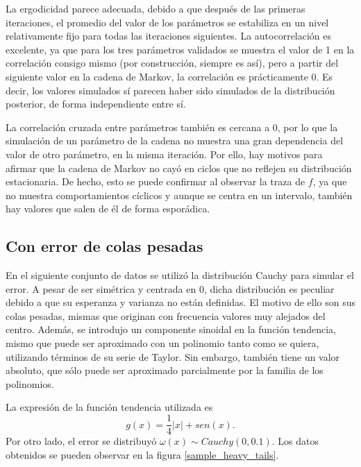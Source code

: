 La ergodicidad parece adecuada, debido a que después de las primeras iteraciones, el promedio del valor de los par\'ametros se estabiliza en un nivel relativamente fijo para todas las iteraciones siguientes. La autocorrelaci\'on es excelente, ya que para los tres par\'ametros validados se muestra el valor de 1 en la correlaci\'on consigo mismo (por construcci\'on, siempre es as\'i), pero a partir del siguiente valor en la cadena de Markov, la correlaci\'on es pr\'acticamente 0. Es decir, los valores simulados s\'i parecen haber sido simulados de la distribuci\'on posterior, de forma independiente entre s\'i.

La correlaci\'on cruzada entre par\'ametros tambi\'en es cercana a 0, por lo que la simulaci\'on de un par\'ametro de la cadena no muestra una gran dependencia del valor de otro par\'ametro, en la misma iteraci\'on. Por ello, hay motivos para afirmar que la cadena de Markov no cay\'o en ciclos que no reflejen su distribuci\'on estacionaria. De hecho, esto se puede confirmar al observar la traza de $f$, ya que no muestra comportamientos c\'iclicos y aunque se centra en un intervalo, tambi\'en hay valores que salen de \'el de forma espor\'adica.

\subsection{Con error de colas pesadas}

En el siguiente conjunto de datos se utiliz\'o la distribuci\'on Cauchy para simular el error. A pesar de ser sim\'etrica y centrada en 0, dicha distribuci\'on es peculiar debido a que su esperanza y varianza no est\'an definidas. El motivo de ello son sus colas pesadas, mismas que originan con frecuencia valores muy alejados del centro. Adem\'as, se introdujo un componente sinoidal en la funci\'on tendencia, mismo que puede ser aproximado con un polinomio tanto como se quiera, utilizando t\'erminos de su serie de Taylor. Sin embargo, tambi\'en tiene un valor absoluto, que s\'olo puede ser aproximado parcialmente por la familia de los polinomios.

La expresi\'on de la funci\'on tendencia utilizada es \begin{equation*}
    g(x) = \frac{1}{4}|x| + sen(x).
\end{equation*}
Por otro lado, el error se distribuy\'o $\omega(x) \sim Cauchy(0,0.1)$. Los datos obtenidos se pueden observar en la figura \ref{sample_heavy_tails}.

